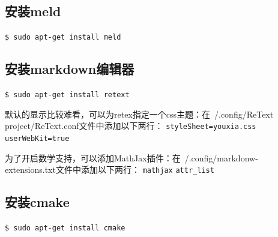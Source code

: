 \subsection{安装meld}
\verb"$ sudo apt-get install meld"

\subsection{安装markdown编辑器}
\verb"$ sudo apt-get install retext"

默认的显示比较难看，可以为retex指定一个css主题：在~/.config/ReText project/ReText.conf文件中添加以下两行：
\verb"styleSheet=youxia.css"
\verb"userWebKit=true"

为了开启数学支持，可以添加MathJax插件：在~/.config/markdonw-extensions.txt文件中添加以下两行：
\verb"mathjax"
\verb"attr_list"

\subsection{安装cmake}
\verb"$ sudo apt-get install cmake"
